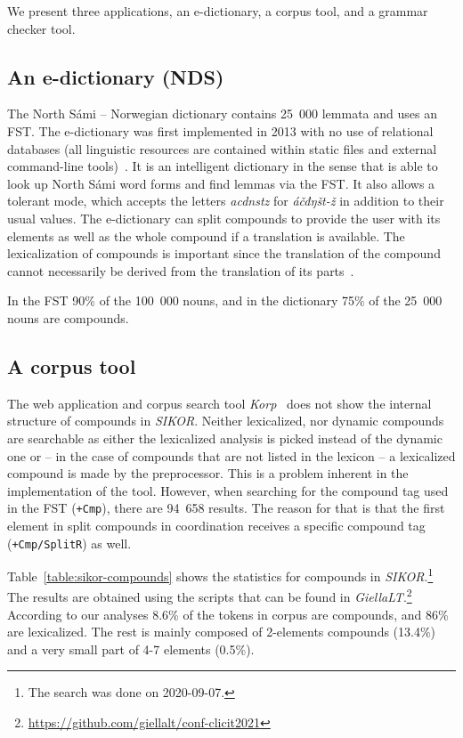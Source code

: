 \documentclass[free]{flammie}
\newcommand{\samit}{\mbox{t\hspace{-.35em}-}} %
\begin{document}
We present three applications, an e-dictionary, a corpus tool, and a grammar checker tool.

\subsection{An e-dictionary (NDS)}\label{ndssection}

The North Sámi -- Norwegian dictionary contains 25~000 lemmata and uses
an FST.
The e-dictionary was first implemented in 2013 with no use of relational databases (all linguistic resources are contained within static files and external command-line tools)~\cite{Johnson2013}.
It is an intelligent dictionary in the sense that is able to look up North Sámi word forms and find lemmas via the FST.
It also allows a tolerant mode, which accepts the letters \textit{acdnstz} for \textit{áčđŋš\samit{}ž} in addition to their usual values.
The e-dictionary can split compounds to provide the user with its elements
as well as the whole compound if a translation is available.
The lexicalization of compounds is important since the translation of the
compound cannot necessarily be derived from the translation of its parts~\cite[p.54]{Antonsen18}.

In the FST 90\% of the 100~000 nouns, and in the dictionary 75\% of the 25~000 nouns
are compounds.  %

\subsection{A corpus tool}

The web application and corpus search tool \textit{Korp}~\cite{Borin2012} does
not show the internal structure of compounds in \textit{SIKOR}.  Neither
lexicalized, nor dynamic compounds are searchable as either the lexicalized
analysis is picked instead of the dynamic one or -- in the case of compounds
that are not listed in the lexicon -- a lexicalized compound is made by the
preprocessor. This is a problem inherent in the implementation of the tool.
However, when searching for the compound tag used in the FST
(\texttt{+Cmp}), there are 94~658 results. The reason for that is that the first
element in split compounds in coordination receives a specific compound tag
(\texttt{+Cmp/SplitR}) as well.

Table~\ref{table:sikor-compounds} shows the statistics for compounds in
\textit{SIKOR}.\footnote{The search was done on 2020-09-07.}  The results are obtained using the scripts that can be found in \textit{GiellaLT}.\footnote{{\label{footnote_scripts}\url{https://github.com/giellalt/conf-clicit2021}}} According to our analyses 8.6\%
of the tokens in corpus are compounds, and 86\% are lexicalized.  The rest is
mainly composed of 2-elements compounds (13.4\%) and a very small part of 4-7 elements (0.5\%). %
\end{document}
